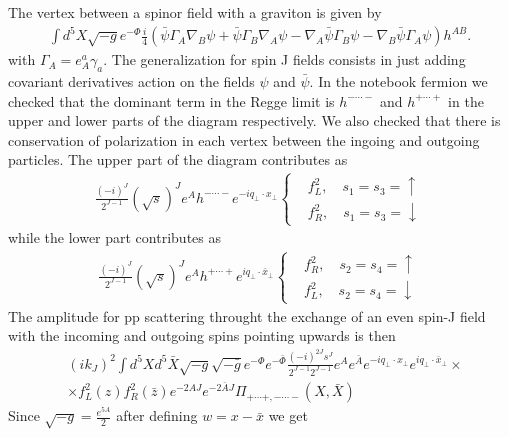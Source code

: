 \documentclass[12pt,a4paper]{article}
\begin{document}
The vertex between a spinor field with a graviton is given by
\begin{align}
    \int d^5 X \sqrt{-g} e^{-\Phi} \frac{i}{4} \left( \bar{\psi} \Gamma_A \nabla_B \psi + \bar{\psi} \Gamma_B \nabla_A  \psi - \nabla_A \bar{\psi} \Gamma_B \psi - \nabla_B \bar{\psi} \Gamma_A \psi  \right) h^{AB}.
\end{align}
with $\Gamma_A = e^a_A \gamma_a$. The generalization for spin J fields consists in just adding covariant derivatives action on the fields $\psi$ and $\bar{\psi}$. In the notebook fermion we checked that the dominant term in the Regge limit is $h^{-\cdots-}$ and $h^{+\cdots+}$ in the upper and lower parts of the diagram respectively. We also checked that there is conservation of polarization in each vertex between the ingoing and outgoing particles. The upper part of the diagram contributes as
\begin{align}
    \frac{{\left(-i\right)}^J}{2^{J-1}} {\left( \sqrt{s} \right)}^J e^A h^{- \cdots -} e^{- i q_\perp \cdot x_\perp}
    \begin{cases}
        & f_L^2 ,\quad s_1 = s_3 = \uparrow \\
        & f_R^2 ,\quad s_1 = s_3 = \downarrow
    \end{cases}
\end{align}
while the lower part contributes as
\begin{align}
    \frac{{\left(-i\right)}^J}{2^{J-1}} {\left( \sqrt{s} \right)}^J e^A h^{+ \cdots +} e^{ i q_\perp \cdot \bar{x}_\perp}
    \begin{cases}
        & f_R^2 ,\quad s_2 = s_4 = \uparrow \\
        & f_L^2 ,\quad s_2 = s_4 = \downarrow
    \end{cases}
\end{align}
The amplitude for pp scattering throught the exchange of an even spin-J field with the incoming and outgoing spins pointing upwards is then 
\begin{align}
    &{\left( i k_J \right)}^2 \int d^5X d^5 \bar{X} \sqrt{-g} \sqrt{-\bar{g}} e^{-\Phi} e^{-\bar{\Phi}} \frac{{\left(-i\right)}^{2 J}s^J}{2^{J-1} 2^{J-1}} e^{A} e^{\bar{A}} e^{- i q_\perp \cdot x_\perp} e^{ i q_\perp \cdot \bar{x}_\perp} \times \\
    & \times f_L^2\left(z\right)f_R^2\left(\bar{z}\right) e^{- 2 A J} e^{-2 \bar{A} J} \Pi_{+\cdots +, - \cdots -} \left(X , \bar{X} \right)
\end{align}
Since $\sqrt{-g} = \frac{e^{5A}}{2}$ after defining $w = x - \bar{x}$ we get
\end{document}
